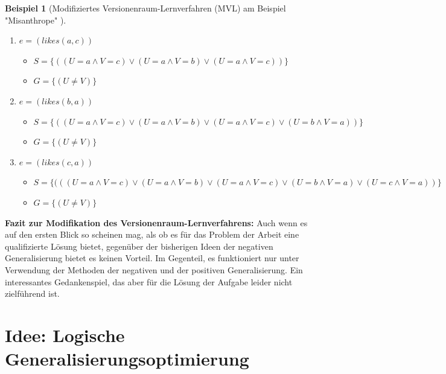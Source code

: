 \documentclass[a4paper, 11pt]{book}
\newtheorem{Bsp}{Beispiel}[section]
\begin{document}
{\begin{Bsp}[Modifiziertes Versionenraum-Lernverfahren (MVL) am Beispiel "{}Misanthrope"{} ]
\begin{itemize}
\begin{enumerate}
		\begin{itemize}
			\item $ S = \{(U = a \land V = c) \lor (U = a \land V = b)\}$ 
			\item $ G = \{(U \neq V)\} $
		\end{itemize}
		\item $ e = (likes(a,c)) $
		\begin{itemize}
			\item $ S = \{((U = a \land V = c) \lor (U = a \land V = b) \lor (U = a \land V = c))\}$ 
			\item $ G = \{(U \neq V)\} $
		\end{itemize}	
		\item $ e = (likes(b,a)) $
		\begin{itemize}
			\item $ S = \{((U = a \land V = c) \lor (U = a \land V = b) \lor (U = a \land V = c) \lor (U = b \land V = a))\}$ 
			\item $ G = \{(U \neq V)\} $
		\end{itemize}
		\item $ e = (likes(c,a)) $
		\begin{itemize}
			\item $ S = \{(((U = a \land V = c) \lor (U = a \land V = b) \lor (U = a \land V = c) \lor (U = b \land V = a) \lor (U = c \land V = a))\}$ 
			\item $ G = \{(U \neq V)\} $
		\end{itemize}	
	\end{enumerate}
\end{itemize}
\end{Bsp}
\textbf{{\large Fazit zur Modifikation des Versionenraum-Lernverfahrens:}} \label{Fazit VRL} 
Auch wenn es auf den ersten Blick so scheinen mag, als ob es für das Problem der Arbeit eine qualifizierte Lösung bietet, gegenüber der bisherigen Ideen der negativen Generalisierung bietet es keinen Vorteil. Im Gegenteil, es funktioniert nur unter Verwendung der Methoden der negativen und der positiven Generalisierung. Ein interessantes Gedankenspiel, das aber für die Lösung der Aufgabe leider nicht zielführend ist. 
}


\section{Idee: Logische Generalisierungsoptimierung} 
\end{document}
